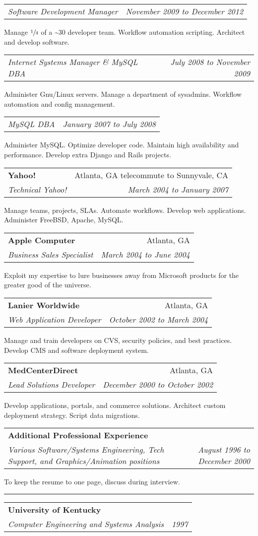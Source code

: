 \documentclass[10pt]{article}
\makeatletter
\newcounter{blocktitlechildren}
\newcommand{\blocktitle}[1]{
    \blocktitlechild{4mm}
    \setcounter{blocktitlechildren}{0}
    {{\sc{#1}\vspace{1.5mm}\hrule}\vspace*{1.5mm}}
}
\newcommand{\blocktitlechild}[2][]{
    \ifthenelse{\equal{\value{blocktitlechildren}}{0}}{}{\vspace{#2}#1}
    \addtocounter{blocktitlechildren}{1}
}
\newcommand{\sectionheader}[4]{
    \blocktitlechild{2mm}
    \begin{tabular*}{\textwidth}{l@{\extracolsep{\fill}}r}
    \textbf{#1} & #2\\
    \emph{#3} & \emph{#4}
    \end{tabular*}
}
\newcommand{\sectionsub}[2]{
    \blocktitlechild{1.4mm}
    \begin{tabular*}{\textwidth}{l@{\extracolsep{\fill}}r}
    \emph{#1} & \emph{#2}
    \end{tabular*}
}
\newenvironment{longtext}[1]{\small {#1}}
\makeatother
\begin{document}
\sectionsub
{Software Development Manager}
{November 2009 to December 2012}
\begin{longtext}
Manage $\sfrac{1}{4}$ of a \~{}30 developer team.
Workflow automation scripting.
Architect and develop software.
\end{longtext}
\sectionsub
{Internet Systems Manager \& MySQL DBA}
{July 2008 to November 2009}
\begin{longtext}
Administer Gnu/Linux servers.
Manage a department of sysadmins.
Workflow automation and config management.
\end{longtext}
\sectionsub
{MySQL DBA}
{January 2007 to July 2008}
\begin{longtext}
Administer MySQL.
Optimize developer code.
Maintain high availability and performance.
Develop extra Django and Rails projects.
\end{longtext}

\sectionheader
{Yahoo!}{Atlanta, GA telecommute to Sunnyvale, CA}
{Technical Yahoo!}
{March 2004 to January 2007}
\begin{longtext}
Manage teams, projects, SLAs.
Automate workflows.
Develop web applications.
Administer FreeBSD, Apache, MySQL.
\end{longtext}

\sectionheader
{Apple Computer}{Atlanta, GA}
{Business Sales Specialist}
{March 2004 to June 2004}
\begin{longtext}
Exploit my expertise to lure businesses away from Microsoft products for the greater good of the universe.
\end{longtext}

\sectionheader
{Lanier Worldwide}{Atlanta, GA}
{Web Application Developer}
{October 2002 to March 2004}
\begin{longtext}
Manage and train developers on CVS, security policies, and best practices.
Develop CMS and software deployment system.
\end{longtext}

\sectionheader
{MedCenterDirect}{Atlanta, GA}
{Lead Solutions Developer}
{December 2000 to October 2002}
\begin{longtext}
Develop applications, portals, and commerce solutions.
Architect custom deployment strategy.
Script data migrations.
\end{longtext}

\sectionheader
{Additional Professional Experience}{}
{Various Software/Systems Engineering, Tech Support, and Graphics/Animation positions}
{August 1996 to December 2000}
\begin{longtext}
To keep the resume to one page, discuss during interview.
\end{longtext}

\blocktitle{Education}
\sectionheader
{University of Kentucky}{}
{Computer Engineering and Systems Analysis}
{1997}
\end{document}
